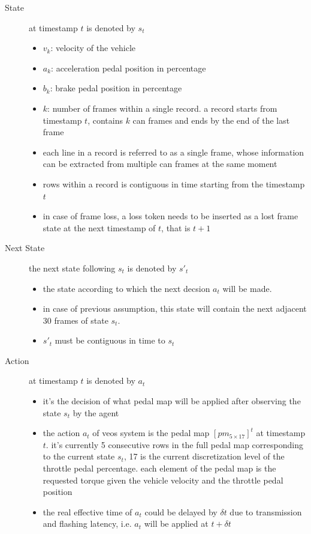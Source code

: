 \documentclass{article}
\begin{document}
\begin{description}
	\item[State] at timestamp $t$ is denoted by $s_t$
	      \begin{itemize}
		      \item $v_k$: velocity of the vehicle
		      \item $a_k$: acceleration pedal position in percentage
		      \item $b_k$: brake pedal position in percentage
		      \item $k$: number of frames within a single record. a record starts from timestamp $t$, contains $k$ can frames and ends by the end of the last frame
		      \item each line in a record is referred to as a single frame, whose information can be extracted from multiple can frames at the same moment
		      \item rows within a record is contiguous in time starting from the timestamp $t$
		      \item in case of frame loss, a loss token needs to be inserted as a lost frame state at the next timestamp of $t$, that is $t+1$
	      \end{itemize}
	\item[Next State] the next state following $s_t$ is denoted by $s'_t$
	      \begin{itemize}
		      \item the state according to which the next decsion $a_t$ will be made.
		      \item in case of previous assumption, this state will contain the next adjacent 30 frames of state $s_t$.
		      \item $s'_t$ must be contiguous in time to $s_t$
	      \end{itemize}
	\item[Action] at timestamp $t$ is denoted by $a_t$
	      \begin{itemize}
		      \item it's the decision of what pedal map will be applied after observing the state $s_t$ by the agent
		      \item the action $a_t$ of veos system is the pedal map $[pm_{5\times17}]^t$ at timestamp $t$. it's currently 5 consecutive rows in the full pedal map corresponding to the current state $s_t$, 17 is the current discretization level of the throttle pedal percentage. each element of the pedal map is the requested torque given the vehicle velocity and the throttle pedal position
		      \item the real effective time of $a_t$ could be delayed by $\delta t$ due to transmission and flashing latency, i.e. $a_t$ will be applied at $t+\delta t$

\end{itemize}
\end{description}
\end{document}
